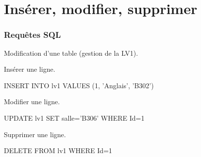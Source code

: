 \section{Insérer, modifier, supprimer}

\begin{frame}[fragile]
\frametitle{Requêtes SQL}

Modification d'une table (gestion de la LV1).

Insérer une ligne.

\begin{GrayBox}[0.85\textwidth]
\begin{semiverbatim}\small
INSERT INTO lv1 VALUES (1, 'Anglais', 'B302')
\end{semiverbatim}
\end{GrayBox}

Modifier une ligne.

\begin{GrayBox}[0.85\textwidth]
\begin{semiverbatim}\small
UPDATE lv1 SET salle='B306' WHERE Id=1
\end{semiverbatim}
\end{GrayBox}

Supprimer une ligne.

\begin{GrayBox}[0.85\textwidth]
\begin{semiverbatim}\small
DELETE FROM lv1 WHERE Id=1
\end{semiverbatim}
\end{GrayBox}     
\end{frame}



